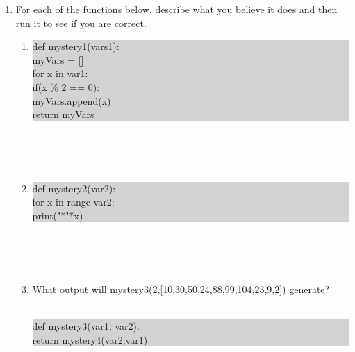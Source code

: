 \documentclass[11pt, letterpaper, onecolumn, oneside, final]{article}
\begin{document}
\begin{enumerate}
\newpage
\item For each of the functions below, describe what you believe it does and then run it to see if you are correct.
\begin{enumerate}
\item
\colorbox{lightgray}{\parbox{.6\textwidth}{\consolas
def mystery1(vars1):\\
\hspace*{8mm}myVars = []\\
\hspace*{8mm}for x in var1:\\
\hspace*{16mm}if(x \% 2 == 0):\\
\hspace*{24mm}myVars.append(x)\\     
\hspace*{8mm}return myVars
}}\\\\\\
\item
\colorbox{lightgray}{\parbox{.6\textwidth}{\consolas
def mystery2(var2):\\
\hspace*{8mm}for x in range var2:\\
\hspace*{16mm}print("*"*x)
}}\\\\\\
\item What output will {\consolas mystery3(2,[10,30,50,24,88,99,104,23,9,2])} generate?\\\\
\colorbox{lightgray}{\parbox{.6\textwidth}{\consolas
def mystery3(var1, var2):\\
\hspace*{8mm}return mystery4(var2,var1)\\

}}
\end{enumerate}
\end{enumerate}
\end{document}
